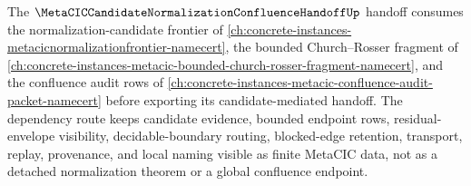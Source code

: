 The $\MetaCICCandidateNormalizationConfluenceHandoffUp$ handoff consumes the normalization-candidate frontier of \autoref{ch:concrete-instances-metacicnormalizationfrontier-namecert}, the bounded Church--Rosser fragment of \autoref{ch:concrete-instances-metacic-bounded-church-rosser-fragment-namecert}, and the confluence audit rows of \autoref{ch:concrete-instances-metacic-confluence-audit-packet-namecert} before exporting its candidate-mediated handoff. The dependency route keeps candidate evidence, bounded endpoint rows, residual-envelope visibility, decidable-boundary routing, blocked-edge retention, transport, replay, provenance, and local naming visible as finite MetaCIC data, not as a detached normalization theorem or a global confluence endpoint.

